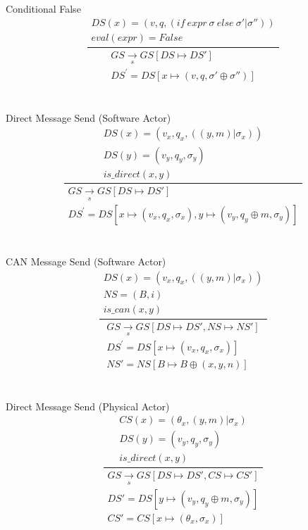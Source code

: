 \documentclass[]{article}
\begin{document}
\\\\
Conditional False
\begin{equation}\label{ConditionalFalse}
\frac
{
	\begin{gathered}
	DS(x)=(v,q,(if \ expr \ \sigma \ else \ \sigma ' |\sigma'')) \\
	eval(expr) = False
	\end{gathered}
}
{
	\begin{gathered}
	GS\xrightarrow[s]{}GS[DS \longmapsto DS'] \\
	DS^{'}=DS[x \longmapsto(v,q,\sigma' \oplus \sigma'')]
	\end{gathered}
}
\end{equation}
\\\\
Direct Message Send (Software Actor)
\begin{equation}
\frac
{
	\begin{gathered}
	DS(x)=(v_x,q_x,((y,m) |\sigma_x)) \\
	DS(y) = (v_y,q_y,\sigma_y) \\
	is\_direct(x,y)
	\end{gathered}
}
{
	\begin{gathered}
	GS\xrightarrow[s]{}GS[DS\longmapsto DS'] \\
	DS^{'}=DS[x \longmapsto(v_x,q_x,\sigma_x),y\longmapsto(v_y,q_y \oplus m,\sigma_y) ]
	\end{gathered}
}
\end{equation}
\\\\
CAN Message Send (Software Actor)
\begin{equation}
\frac
{
	\begin{gathered}
	DS(x)=(v_x,q_x,((y,m) |\sigma_x)) \\
	NS = (B,i) \\
	is\_can(x,y)
	\end{gathered}
}
{
	\begin{gathered}
	GS\xrightarrow[s]{}GS[DS\longmapsto DS', NS\longmapsto NS'] \\
	DS^{'}=DS[x \longmapsto(v_x,q_x,\sigma_x)]\\
	NS' = NS[B\longmapsto B \oplus (x,y,n)]
	\end{gathered}
}
\end{equation}
\\\\
Direct Message Send (Physical Actor)
\begin{equation}
\frac
{
	\begin{gathered}
	CS(x) = (\theta_x, (y,m)|\sigma_x)  \\
	DS(y) = (v_y,q_y,\sigma_y) \\
	is\_direct(x,y)
	\end{gathered}
}
{
	\begin{gathered}
	GS\xrightarrow[s]{}GS[ DS\longmapsto DS',CS\longmapsto CS'] \\
	DS'=DS[y\longmapsto(v_y,q_y \oplus m,\sigma_y) ]\\
	CS'=CS[x \longmapsto(\theta_x,\sigma_x)]\\
	\end{gathered}
}
\end{equation}
\end{document}
